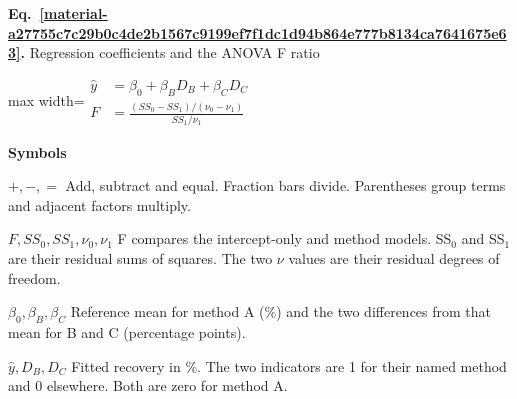 \documentclass[11pt,a4paper]{article}
\begin{document}
\par\medskip
\noindent\begin{minipage}{\linewidth}
\label{material-a27755c7c29b0c4de2b1567c9199ef7f1dc1d94b864e777b8134ca7641675e63}
\noindent\textbf{Eq.~\ref*{material-a27755c7c29b0c4de2b1567c9199ef7f1dc1d94b864e777b8134ca7641675e63}.} Regression coefficients and the ANOVA F ratio\par\nopagebreak
\begin{center}\begin{adjustbox}{max width=\linewidth}$\displaystyle \begin{aligned}\widehat y&=\beta_0+\beta_B D_B+\beta_C D_C\\[.65em]F&=\frac{(SS_0-SS_1)/(\nu_0-\nu_1)}{SS_1/\nu_1}\end{aligned}$\end{adjustbox}\end{center}

\par\noindent\textbf{Symbols}

\par\noindent\textbf{\(+,-,=\)} Add, subtract and equal. Fraction bars divide. Parentheses group terms and adjacent factors multiply.

\par\noindent\textbf{\(F,SS_0,SS_1,\nu_0,\nu_1\)} F compares the intercept-only and method models. SS\ensuremath{{}_0} and SS\ensuremath{{}_1} are their residual sums of squares. The two \ensuremath{\nu} values are their residual degrees of freedom.

\par\noindent\textbf{\(\beta_0,\beta_B,\beta_C\)} Reference mean for method A (\%) and the two differences from that mean for B and C (percentage points).

\par\noindent\textbf{\(\widehat y,D_B,D_C\)} Fitted recovery in \%. The two indicators are 1 for their named method and 0 elsewhere. Both are zero for method A.

\end{minipage}\par
\medskip
\end{document}
